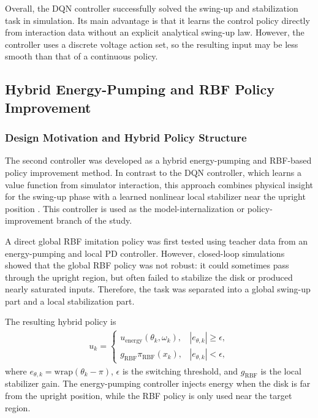 Overall, the DQN controller successfully solved the swing-up and stabilization
task in simulation. Its main advantage is that it learns the control policy
directly from interaction data without an explicit analytical swing-up law.
However, the controller uses a discrete voltage action set, so the resulting
input may be less smooth than that of a continuous policy.



\subsection{Hybrid Energy-Pumping and RBF Policy Improvement}

\subsubsection{Design Motivation and Hybrid Policy Structure}

The second controller was developed as a hybrid energy-pumping and RBF-based
policy improvement method. In contrast to the DQN controller, which learns a
value function from simulator interaction, this approach combines physical
insight for the swing-up phase with a learned nonlinear local stabilizer near
the upright position \cite{course5sc28,broomhead1988rbf}. This controller is used as the model-internalization or
policy-improvement branch of the study.

A direct global RBF imitation policy was first tested using teacher data from
an energy-pumping and local PD controller. However, closed-loop simulations
showed that the global RBF policy was not robust: it could sometimes pass
through the upright region, but often failed to stabilize the disk or produced
nearly saturated inputs. Therefore, the task was separated into a global
swing-up part and a local stabilization part.

The resulting hybrid policy is
\begin{equation}
\begin{aligned}
    u_k =
    \begin{cases}
        u_{\mathrm{energy}}(\theta_k,\omega_k),
        & |e_{\theta,k}| \geq \epsilon, \\[2mm]
        g_{\mathrm{RBF}}\pi_{\mathrm{RBF}}(x_k),
        & |e_{\theta,k}| < \epsilon,
    \end{cases}
\end{aligned}
\label{eq:hybrid_policy}
\end{equation}
where \(e_{\theta,k}=\mathrm{wrap}(\theta_k-\pi)\), \(\epsilon\) is the
switching threshold, and \(g_{\mathrm{RBF}}\) is the local stabilizer gain. The
energy-pumping controller injects energy when the disk is far from the upright
position, while the RBF policy is only used near the target region.


